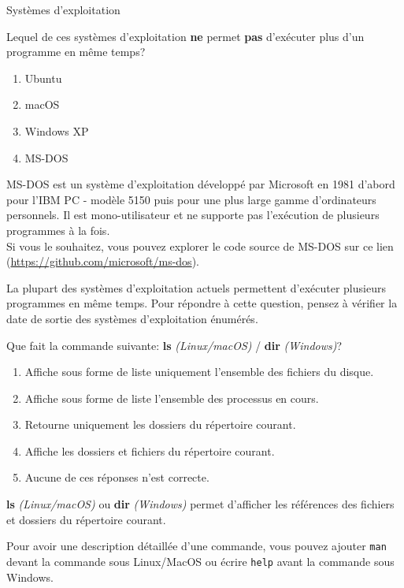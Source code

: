 \begin{section}{Systèmes d'exploitation}
\begin{Exercice}[2 minutes]
    Lequel de ces systèmes d'exploitation \textbf{ne} permet \textbf{pas} d'exécuter plus d'un programme en même temps?
    \begin{enumerate}
        \item Ubuntu
        \item macOS
        \item Windows XP
        \item MS-DOS
    \end{enumerate}
    \begin{solution}
        MS-DOS est un système d'exploitation développé par Microsoft en 1981 d'abord pour l'IBM PC - modèle 5150 puis pour une plus large gamme d'ordinateurs personnels. Il est mono-utilisateur et ne supporte pas l'exécution de plusieurs programmes à la fois.
        \\
        Si vous le souhaitez, vous pouvez explorer le code source de MS-DOS sur ce lien (\url{https://github.com/microsoft/ms-dos}). 
    \end{solution}
    \begin{conseil}
        La plupart des systèmes d'exploitation actuels permettent d'exécuter plusieurs programmes en même temps. Pour répondre à cette question, pensez à vérifier la date de sortie des systèmes d'exploitation énumérés.
    \end{conseil}
\end{Exercice}

\begin{Exercice}[3 minutes]
        Que fait la commande suivante: \textbf{ls} \textit{(Linux/macOS)} / \textbf{dir} \textit{(Windows)}?
        \begin{enumerate}
            \item Affiche sous forme de liste uniquement l'ensemble des fichiers du disque.
            \item Affiche sous forme de liste l'ensemble des processus en cours.
            \item Retourne uniquement les dossiers du répertoire courant.
            \item Affiche les dossiers et fichiers du répertoire courant.
            \item Aucune de ces réponses n'est correcte.
        \end{enumerate}
        \begin{solution}
            \textbf{ls} \textit{(Linux/macOS)} ou \textbf{dir} \textit{(Windows)} permet d'afficher les références des fichiers et dossiers du répertoire courant.
        \end{solution}
        \begin{conseil}
            Pour avoir une description détaillée d'une commande, vous pouvez ajouter \lstinline{man} devant la commande sous Linux/MacOS ou écrire \texttt{help} avant la commande sous Windows.
        \end{conseil}
    \end{Exercice}


\end{section}
